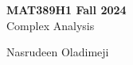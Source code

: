\documentclass[openany,11pt,fleqn]{book} %
\begin{document}

\begingroup
\thispagestyle{empty}
\centering
\vspace*{5cm}
\par\normalfont\fontsize{35}{35}\sffamily\selectfont
\textbf{MAT389H1 Fall 2024}\\
{\LARGE Complex Analysis}\par %
\vspace*{1cm}
{\Huge Nasrudeen Oladimeji}\par %
\endgroup
\end{document}
